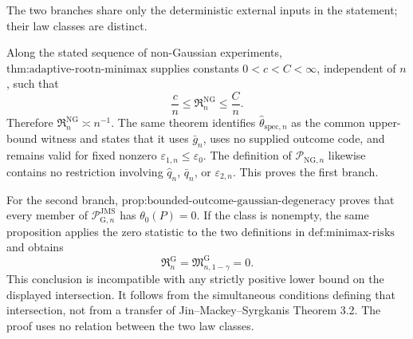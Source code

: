 The two branches share only the deterministic external inputs in the statement; their law classes are distinct.

Along the stated sequence of non-Gaussian experiments, \(\text{thm:adaptive-rootn-minimax}\) supplies constants \(0<c<C<\infty\), independent of \(n\), such that
\[
 \frac{c}{n}
 \le \mathfrak R_n^{\mathrm{NG}}
 \le \frac{C}{n}.
\]
Therefore \(\mathfrak R_n^{\mathrm{NG}}\asymp n^{-1}\). The same theorem identifies \(\widehat\theta_{\mathrm{spec},n}\) as the common upper-bound witness and states that it uses \(\bar g_n\), uses no supplied outcome code, and remains valid for fixed nonzero \(\varepsilon_{1,n}\le\varepsilon_0\). The definition of \(\mathcal P_{\mathrm{NG},n}\) likewise contains no restriction involving \(\widehat q_n\), \(\bar q_n\), or \(\varepsilon_{2,n}\). This proves the first branch.

For the second branch, \(\text{prop:bounded-outcome-gaussian-degeneracy}\) proves that every member of \(\mathcal P_{\mathrm G,n}^{\mathrm{JMS}}\) has \(\theta_0(P)=0\). If the class is nonempty, the same proposition applies the zero statistic to the two definitions in \(\text{def:minimax-risks}\) and obtains
\[
 \mathfrak R_n^{\mathrm G}
 =\mathfrak M_{n,1-\gamma}^{\mathrm G}
 =0.
\]
This conclusion is incompatible with any strictly positive lower bound on the displayed intersection. It follows from the simultaneous conditions defining that intersection, not from a transfer of Jin--Mackey--Syrgkanis Theorem 3.2. The proof uses no relation between the two law classes.